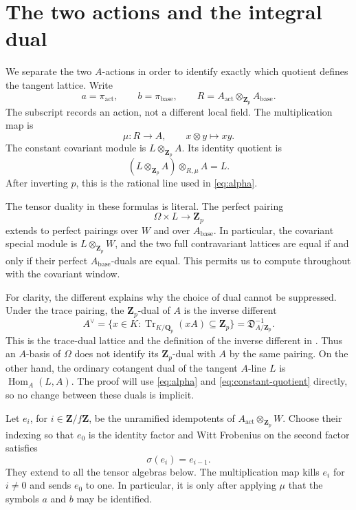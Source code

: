 \documentclass[11pt]{article}
\theoremstyle{definition}\newtheorem{definition}[theorem]{Definition}
\theoremstyle{remark}\newtheorem{remark}[theorem]{Remark}
\newcommand{\ZZ}{\mathbf Z}
\newcommand{\QQ}{\mathbf Q}
\newcommand{\Hom}{\operatorname{Hom}}
\newcommand{\act}{\mathrm{act}}
\newcommand{\base}{\mathrm{base}}
\begin{document}
\section{The two actions and the integral dual}\label{sec:normalization}

We separate the two $A$-actions in order to identify exactly which quotient defines the tangent lattice. Write
\[
 a=\pi_{\act},\qquad b=\pi_{\base},\qquad
 R=A_{\act}\otimes_{\ZZ_p}A_{\base}.
\]
The subscript records an action, not a different local field. The multiplication map is
\begin{equation}\label{eq:mu}
 \mu:R\longrightarrow A,\qquad x\otimes y\longmapsto xy.
\end{equation}
The constant covariant module is $L\otimes_{\ZZ_p}A$. Its identity quotient is
\begin{equation}\label{eq:constant-quotient}
 (L\otimes_{\ZZ_p}A)\otimes_{R,\mu}A=L.
\end{equation}
After inverting $p$, this is the rational line used in \eqref{eq:alpha}.

The tensor duality in these formulas is literal. The perfect pairing
\[
 \Omega\times L\longrightarrow\ZZ_p
\]
extends to perfect pairings over $W$ and over $A_{\base}$. In particular, the covariant special module is $L\otimes_{\ZZ_p}W$, and the two full contravariant lattices are equal if and only if their perfect $A_{\base}$-duals are equal. This permits us to compute throughout with the covariant window.

For clarity, the different explains why the choice of dual cannot be suppressed. Under the trace pairing, the $\ZZ_p$-dual of $A$ is the inverse different
\[
 A^\vee=\{x\in K:\operatorname{Tr}_{K/\QQ_p}(xA)\subseteq\ZZ_p\}
       =\mathfrak D_{A/\ZZ_p}^{-1}.
\]
This is the trace-dual lattice and the definition of the inverse different in \citet[Chapter~III, Section~2, Proposition~4, p.~49; Section~3, p.~50]{Serre}.
Thus an $A$-basis of $\Omega$ does not identify its $\ZZ_p$-dual with $A$ by the same pairing. On the other hand, the ordinary cotangent dual of the tangent $A$-line $L$ is $\Hom_A(L,A)$. The proof will use \eqref{eq:alpha} and \eqref{eq:constant-quotient} directly, so no change between these duals is implicit.

Let $e_i$, for $i\in\ZZ/f\ZZ$, be the unramified idempotents of $A_{\act}\otimes_{\ZZ_p}W$. Choose their indexing so that $e_0$ is the identity factor and Witt Frobenius on the second factor satisfies
\begin{equation}\label{eq:idempotents}
 \sigma(e_i)=e_{i-1}.
\end{equation}
They extend to all the tensor algebras below. The multiplication map kills $e_i$ for $i\ne0$ and sends $e_0$ to one. In particular, it is only after applying $\mu$ that the symbols $a$ and $b$ may be identified.
\end{document}
